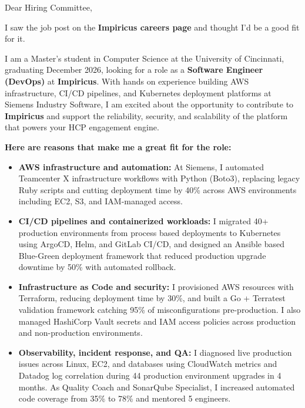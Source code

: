 \documentclass[11pt]{letter}
\date{}
\begin{document}
\begin{letter}{}

\opening{Dear Hiring Committee,}

I saw the job post on the \textbf{Impiricus careers page} and thought I'd be a good fit for it.

I am a Master's student in Computer Science at the University of Cincinnati, graduating December 2026, looking for a role as a \textbf{Software Engineer (DevOps)} at \textbf{Impiricus}. With hands on experience building AWS infrastructure, CI/CD pipelines, and Kubernetes deployment platforms at Siemens Industry Software, I am excited about the opportunity to contribute to \textbf{Impiricus} and support the reliability, security, and scalability of the platform that powers your HCP engagement engine.

\textbf{Here are reasons that make me a great fit for the role:}

\begin{itemize}[leftmargin=*, itemsep=0.45em]
    \item \textbf{AWS infrastructure and automation:} At Siemens, I automated Teamcenter X infrastructure workflows with Python (Boto3), replacing legacy Ruby scripts and cutting deployment time by 40\% across AWS environments including EC2, S3, and IAM-managed access.

    \item \textbf{CI/CD pipelines and containerized workloads:} I migrated 40+ production environments from process based deployments to Kubernetes using ArgoCD, Helm, and GitLab CI/CD, and designed an Ansible based Blue-Green deployment framework that reduced production upgrade downtime by 50\% with automated rollback.

    \item \textbf{Infrastructure as Code and security:} I provisioned AWS resources with Terraform, reducing deployment time by 30\%, and built a Go + Terratest validation framework catching 95\% of misconfigurations pre-production. I also managed HashiCorp Vault secrets and IAM access policies across production and non-production environments.

    \item \textbf{Observability, incident response, and QA:} I diagnosed live production issues across Linux, EC2, and databases using CloudWatch metrics and Datadog log correlation during 44 production environment upgrades in 4 months. As Quality Coach and SonarQube Specialist, I increased automated code coverage from 35\% to 78\% and mentored 5 engineers.


\end{itemize}
\end{letter}
\end{document}

